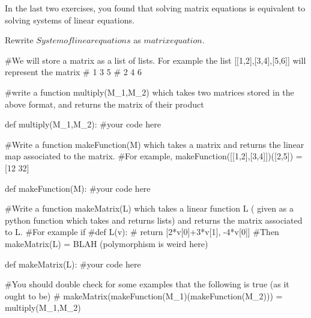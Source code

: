 	In the last two exercises, you found that solving matrix equations is equivalent to solving systems of linear equations.
	
	\begin{question}
	Rewrite  $System of linear equations$ as $matrix equation$.
	\end{question}
	
	\begin{python}
		#We will store a matrix as a list of lists.   For example the list [[1,2],[3,4],[5,6]] will represent the matrix 
		# 1 3 5
		# 2 4 6
		
		#write a function multiply(M_1,M_2) which takes two matrices stored in the above format, and returns the matrix of their product
		
		def multiply(M_1,M_2):
			#your code here
		
		#Write a function makeFunction(M) which takes a matrix and returns the linear map associated to the matrix.
		#For example, makeFunction([[1,2],[3,4]])([2,5]) = [12 32]
		
		def makeFunction(M):
			#your code here
		
		#Write a function makeMatrix(L) which takes a linear function L ( given as a python function which takes and returns lists) and returns the matrix associated to L.
		#For example if  
		#def L(v):
		#  return [2*v[0]+3*v[1], -4*v[0]]
		#Then makeMatrix(L) = BLAH (polymorphism is weird here)
		
		def makeMatrix(L):
			#your code here
		
		#You should double check for some examples that the following is true (as it ought to be)
		# makeMatrix(makeFunction(M_1)(makeFunction(M_2))) = multiply(M_1,M_2)
		
		
	\end{python}
	
	
	
	
	

